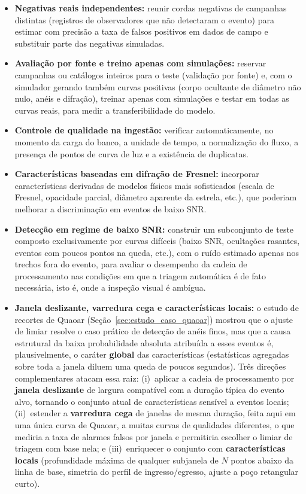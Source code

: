 \begin{itemize}
	\item \textbf{Negativas reais independentes:} reunir cordas negativas de campanhas distintas (registros de observadores que não detectaram o evento) para estimar com precisão a taxa de falsos positivos em dados de campo e substituir parte das negativas simuladas.

	\item \textbf{Avaliação por fonte e treino apenas com simulações:} reservar campanhas ou catálogos inteiros para o teste (validação por fonte) e, com o simulador gerando também curvas positivas (corpo ocultante de diâmetro não nulo, anéis e difração), treinar apenas com simulações e testar em todas as curvas reais, para medir a transferibilidade do modelo.

	\item \textbf{Controle de qualidade na ingestão:} verificar automaticamente, no momento da carga do banco, a unidade de tempo, a normalização do fluxo, a presença de pontos de curva de luz e a existência de duplicatas.

	\item \textbf{Características baseadas em difração de Fresnel:} incorporar características derivadas de modelos físicos mais sofisticados (escala de Fresnel, opacidade parcial, diâmetro aparente da estrela, etc.), que poderiam melhorar a discriminação em eventos de baixo SNR.

	\item \textbf{Detecção em regime de baixo SNR:} construir um subconjunto de teste composto exclusivamente por curvas difíceis (baixo SNR, ocultações rasantes, eventos com poucos pontos na queda, etc.), com o ruído estimado apenas nos trechos fora do evento, para avaliar o desempenho da cadeia de processamento nas condições em que a triagem automática é de fato necessária, isto é, onde a inspeção visual é ambígua.

	\item \textbf{Janela deslizante, varredura cega e características locais:} o estudo de recortes de Quaoar (Seção~\ref{sec:estudo_caso_quaoar}) mostrou que o ajuste de limiar resolve o caso prático de detecção de anéis finos, mas que a causa estrutural da baixa probabilidade absoluta atribuída a esses eventos é, plausivelmente, o caráter \textbf{global} das características (estatísticas agregadas sobre toda a janela diluem uma queda de poucos segundos). Três direções complementares atacam essa raiz: (i)~aplicar a cadeia de processamento por \textbf{janela deslizante} de largura compatível com a duração típica do evento alvo, tornando o conjunto atual de características sensível a eventos locais; (ii)~estender a \textbf{varredura cega} de janelas de mesma duração, feita aqui em uma única curva de Quaoar, a muitas curvas de qualidades diferentes, o que mediria a taxa de alarmes falsos por janela e permitiria escolher o limiar de triagem com base nela; e (iii)~enriquecer o conjunto com \textbf{características locais} (profundidade máxima de qualquer subjanela de $N$ pontos abaixo da linha de base, simetria do perfil de ingresso/egresso, ajuste a poço retangular curto).


\end{itemize}
